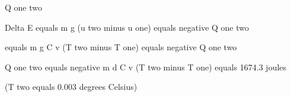 Q one two

Delta E equals m g (u two minus u one) equals negative Q one two

equals m g C v (T two minus T one) equals negative Q one two

Q one two equals negative m d C v (T two minus T one) equals 1674.3 joules

(T two equals 0.003 degrees Celsius)